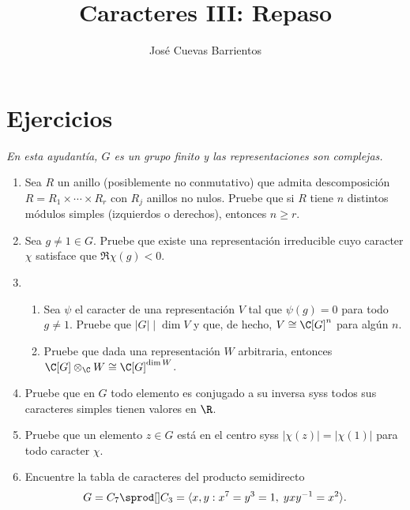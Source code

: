 \documentclass[11pt, reqno]{amsart}
\title{Caracteres III: Repaso}
\date{\DTMdate{2025-10-22}}
\author{José Cuevas Barrientos}
\begin{document}
\maketitle

\section{Ejercicios}
\begin{center}
	\slshape
	En esta ayudantía, $G$ es un grupo finito y las representaciones son complejas.
\end{center}
\begin{enumerate}
	\item Sea $R$ un anillo (posiblemente no conmutativo) que admita descomposición $R = R_1 \times \cdots \times R_r$ con $R_j$ anillos no nulos.
		Pruebe que si $R$ tiene $n$ distintos módulos simples (izquierdos o derechos), entonces $n \ge r$.

	\item Sea $g \ne 1 \in G$.
		Pruebe que existe una representación irreducible cuyo caracter $\chi$ satisface que $\Re\chi(g) < 0$.

	\item
		\begin{enumerate}
			\item Sea $\psi$ el caracter de una representación $V$ tal que $\psi(g) = 0$ para todo $g \ne 1$.
				Pruebe que $|G| \mid \dim V$ y que, de hecho, $V \cong \C[G]^n$ para algún $n$.
			\item Pruebe que dada una representación $W$ arbitraria, entonces $\C[G] \otimes_\C W \cong \C[G]^{\dim W}$.
		\end{enumerate}

	\item Pruebe que en $G$ todo elemento es conjugado a su inversa syss todos sus caracteres simples tienen valores en $\R$.

	\item Pruebe que un elemento $z \in G$ está en el centro syss $|\chi(z)| = |\chi(1)|$ para todo caracter $\chi$.

	\item Encuentre la tabla de caracteres del producto semidirecto
		\[
			G = C_7 \sprod[] C_3 = \langle x, y : x^7 = y^3 = 1, \; yxy^{-1} = x^2 \rangle.
		\]


\end{enumerate}
\end{document}
